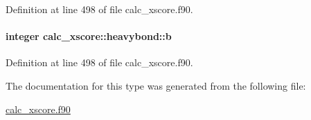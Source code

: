 Definition at line 498 of file calc\-\_\-xscore.\-f90.

\hypertarget{structcalc__xscore_1_1heavybond_ab7b11fe3afb42efcf209e07e1bd16f8a}{
\paragraph[{b}]{\setlength{\rightskip}{0pt plus 5cm}integer calc\-\_\-xscore\-::heavybond\-::b}}\label{structcalc__xscore_1_1heavybond_ab7b11fe3afb42efcf209e07e1bd16f8a}


Definition at line 498 of file calc\-\_\-xscore.\-f90.



The documentation for this type was generated from the following file\-:\begin{DoxyCompactItemize}
\item 
\hyperlink{calc__xscore_8f90}{calc\-\_\-xscore.\-f90}\end{DoxyCompactItemize}
